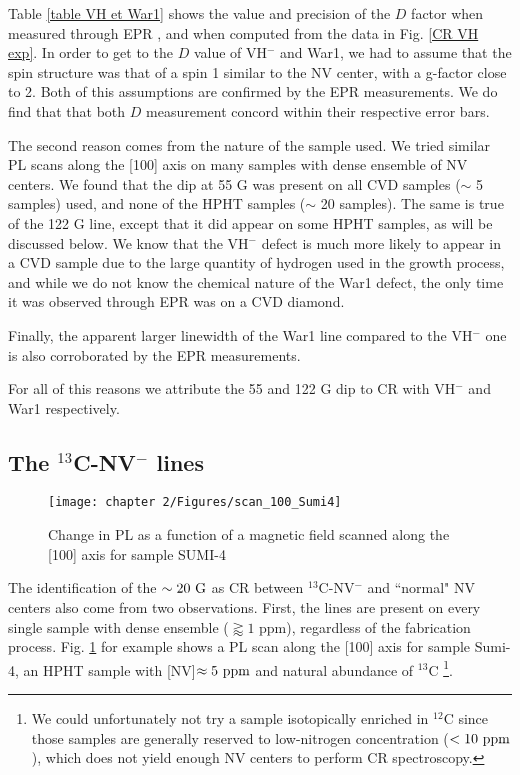 \documentclass[a4paper, 11pt]{book}
\begin{document}
Table \ref{table VH et War1} shows the value and precision of the $D$ factor when measured through EPR \citep{cruddace2007magnetic}, and when computed from the data in Fig. \ref{CR VH exp}. In order to get to the $D$ value of VH$^-$ and War1, we had to assume that the spin structure was that of a spin 1 similar to the NV center, with a g-factor close to 2. Both of this assumptions are confirmed by the EPR measurements. We do find that that both $D$ measurement concord within their respective error bars.

The second reason comes from the nature of the sample used. We tried similar PL scans along the [100] axis on many samples with dense ensemble of NV centers. We found that the dip at 55 G was present on all CVD samples ($\sim$ 5 samples) used, and none of the HPHT samples ($\sim$ 20 samples). The same is true of the 122 G line, except that it did appear on some HPHT samples, as will be discussed below. We know that the VH$^-$ defect is much more likely to appear in a CVD sample due to the large quantity of hydrogen used in the growth process, and while we do not know the chemical nature of the War1 defect, the only time it was observed through EPR was on a CVD diamond.

Finally, the apparent larger linewidth of the War1 line compared to the VH$^-$ one is also corroborated by the EPR measurements.

For all of this reasons we attribute the 55 and 122 G dip to CR with VH$^-$ and War1 respectively.

\subsection{The $^{13}$C-NV$^-$ lines}

\begin{figure}[h]
\centering
\texttt{[image: chapter 2/Figures/scan\_100\_Sumi4]}
\caption{Change in PL as a function of a magnetic field scanned along the [100] axis for sample SUMI-4}
\label{scan sumi 4}
\end{figure}

The identification of the $\sim 20\ \rm G$ as CR between $^{13}$C-NV$^-$ and ``normal" NV centers also come from two observations. First, the lines are present on every single sample with dense ensemble ($\gtrapprox 1$ ppm), regardless of the fabrication process. Fig. \ref{scan sumi 4} for example shows a PL scan along the [100] axis for sample Sumi-4, an HPHT sample with [NV]$\approx 5\ \rm ppm$ and natural abundance of $^{13}$C \footnote{We could unfortunately not try a sample isotopically enriched in $^{12}$C since those samples are generally reserved to low-nitrogen concentration ($< 10\ \rm ppm$), which does not yield enough NV centers to perform CR spectroscopy. }. 
\end{document}
